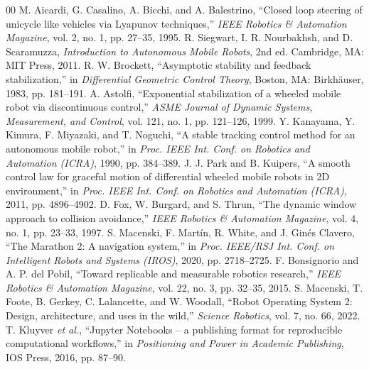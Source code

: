 \documentclass[conference]{IEEEtran}
\begin{document}
\begin{thebibliography}{00}
 M. Aicardi, G. Casalino, A. Bicchi, and
A. Balestrino, ``Closed loop steering of unicycle like vehicles via Lyapunov
techniques,'' \emph{IEEE Robotics \& Automation Magazine}, vol. 2, no. 1,
pp. 27--35, 1995.
 R. Siegwart, I. R. Nourbakhsh, and
D. Scaramuzza, \emph{Introduction to Autonomous Mobile Robots}, 2nd ed.
Cambridge, MA: MIT Press, 2011.
 R. W. Brockett, ``Asymptotic stability and
feedback stabilization,'' in \emph{Differential Geometric Control Theory},
Boston, MA: Birkh\"auser, 1983, pp. 181--191.
 A. Astolfi, ``Exponential stabilization of a
wheeled mobile robot via discontinuous control,'' \emph{ASME Journal of
Dynamic Systems, Measurement, and Control}, vol. 121, no. 1, pp. 121--126,
1999.
 Y. Kanayama, Y. Kimura, F. Miyazaki, and
T. Noguchi, ``A stable tracking control method for an autonomous mobile
robot,'' in \emph{Proc. IEEE Int. Conf. on Robotics and Automation (ICRA)},
1990, pp. 384--389.
 J. J. Park and B. Kuipers, ``A smooth control law for
graceful motion of differential wheeled mobile robots in 2D environment,'' in
\emph{Proc. IEEE Int. Conf. on Robotics and Automation (ICRA)}, 2011,
pp. 4896--4902.
 D. Fox, W. Burgard, and S. Thrun, ``The dynamic
window approach to collision avoidance,'' \emph{IEEE Robotics \& Automation
Magazine}, vol. 4, no. 1, pp. 23--33, 1997.
 S. Macenski, F. Mart\'in, R. White, and
J. Ginés Clavero, ``The Marathon 2: A navigation system,'' in \emph{Proc.
IEEE/RSJ Int. Conf. on Intelligent Robots and Systems (IROS)}, 2020,
pp. 2718--2725.
 F. Bonsignorio and A. P. del Pobil, ``Toward
replicable and measurable robotics research,'' \emph{IEEE Robotics \&
Automation Magazine}, vol. 22, no. 3, pp. 32--35, 2015.
 S. Macenski, T. Foote, B. Gerkey, C. Lalancette,
and W. Woodall, ``Robot Operating System 2: Design, architecture, and uses in
the wild,'' \emph{Science Robotics}, vol. 7, no. 66, 2022.
 T. Kluyver \emph{et al.}, ``Jupyter Notebooks --
a publishing format for reproducible computational workflows,'' in
\emph{Positioning and Power in Academic Publishing}, IOS Press, 2016,
pp. 87--90.
\end{thebibliography}
\end{document}

